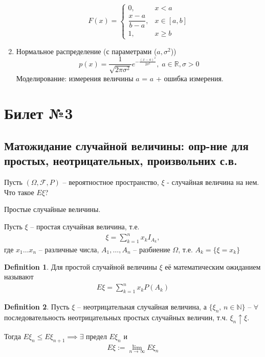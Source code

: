 \documentclass[a4paper]{article}
\theoremstyle{plain}
\theoremstyle{remark}
\theoremstyle{definition}
\newtheorem{definition}{Definition}
\newcommand{\setR}{\mathbb{R}}
\newcommand{\setN}{\mathbb{N}}
\newcommand{\setF}{\mathcal{F}}
\renewcommand{\leq}{\leqslant}
\renewcommand{\geq}{\geqslant}
\begin{document}
\begin{enumerate}
			\begin{equation*}
				F(x) =
				\begin{cases}
					0, &x < a\\
					\dfrac{x - a}{b - a}, &x \in [a, b]\\
					1, &x \geq b
				\end{cases}
			\end{equation*}
		
		\item 
			Нормальное распределение (с параметрами ($a, \sigma^2$))
			\begin{equation*}
				p(x) = \frac{1}{\sqrt{2\pi \sigma^2}} e^{-\frac{(x - a)^2}{2 \sigma^2}},\;
				a \in \setR, \sigma > 0
			\end{equation*}
			Моделирование: измерения величины $a$ = $a$ + ошибка измерения.
\end{enumerate}

\newpage
\section{Билет №3}
\subsection{Матожидание случайной величины: опр-ние для простых, неотрицательных, произвольних с.в.}
Пусть $(\Omega, \setF, P)$ -- вероятностное пространство, $\xi$ - случайная величина на нем. 
Что такое $E \xi$?

Простые случайные величины.

Пусть $\xi$ -- простая случайная величина, т.е. 
\begin{align*}
  \xi = \sum_{k = 1}^{n} x_k I_{A_k},
\end{align*}
где $x_1 \ldots x_n$ -- различные числа, $A_1, \ldots, A_n$ 
-- разбиение $\Omega$, т.е. $A_k = \{ \xi = x_k \}$

\begin{definition}
  Для простой случайной величины $\xi$ её математическим ожиданием называют
  \begin{align*}
    E\xi = \sum_{k = 1}^n x_k P(A_k)
  \end{align*}
\end{definition}

\begin{definition}
  Пусть $\xi$ -- неотрицательная случайная величина, 
  а $\{ \xi_n,\, n \in \setN \}$ -- $\forall$ последовательность неотрицательных 
  простых случайных величин, т.ч. $\xi_n \uparrow \xi$. 

  Тогда $E \xi_n \leq E \xi_{n + 1} \implies \exists$ предел $E \xi_n$ и
  \begin{align*}
    E \xi := \lim_{n \to \infty} E \xi_n
  \end{align*}
\end{definition}
\end{document}
